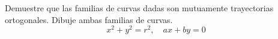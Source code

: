 \setcounter{enumi}{38}
\item Demuestre que las familias de curvas dadas son mutuamente trayectorias ortogonales. Dibuje ambas familias de curvas.
$$x^2 + y^2 = r^2, \quad ax + by = 0$$
